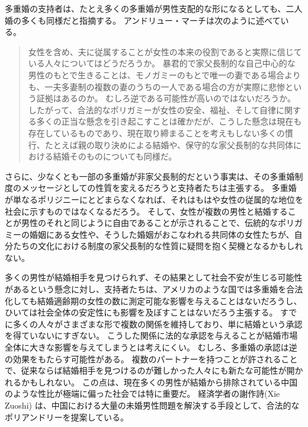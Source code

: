 \documentclass[paper=a4,book,openany]{jlreq}
\begin{document}
多重婚の支持者は、たとえ多くの多重婚が男性支配的な形になるとしても、二人婚の多くも同様だと指摘する。
アンドリュー・マーチは次のように述べている。

\begin{quote}
女性を含め、夫に従属することが女性の本来の役割であると実際に信じている人々についてはどうだろうか。
暴君的で家父長制的な自己中心的な男性のもとで生きることは、モノガミーのもとで唯一の妻である場合よりも、一夫多妻制の複数の妻のうちの一人である場合の方が実際に悲惨という証拠はあるのか。
むしろ逆である可能性が高いのではないだろうか。
したがって、合法的なポリガミーが女性の安全、福祉、そして自律に関する多くの正当な懸念を引き起こすことは確かだが、こうした懸念は現在も存在しているものであり、現在取り締まることを考えもしない多くの慣行、たとえば親の取り決めによる結婚や、保守的な家父長制的な共同体における結婚そのものについても同様だ。
\citep[p.260]{march11:_is_there_right_polyg}
\end{quote}

さらに、少なくとも一部の多重婚が非家父長制的だという事実は、その多重婚制度のメッセージとしての性質を変えるだろうと支持者たちは主張する。
多重婚が単なるポリジニーにとどまらなくなれば、それはもはや女性の従属的な地位を社会に示すものではなくなるだろう。
そして、女性が複数の男性と結婚することが男性のそれと同じように自由であることが示されることで、伝統的なポリガミーの婚姻にある女性や、そうした婚姻がおこなわれる共同体の女性たちが、自分たちの文化における制度の家父長制的な性質に疑問を抱く契機となるかもしれない。

多くの男性が結婚相手を見つけられず、その結果として社会不安が生じる可能性があるという懸念に対し、支持者たちは、アメリカのような国では多重婚を合法化しても結婚適齢期の女性の数に測定可能な影響を与えることはないだろうし、ひいては社会全体の安定性にも影響を及ぼすことはないだろう主張する。
すでに多くの人々がさまざまな形で複数の関係を維持しており、単に結婚という承認を得ていないにすぎない。
こうした関係に法的な承認を与えることが結婚市場全体に大きな影響を与えてしまうとは考えにくい。
むしろ、多重婚の承認は逆の効果をもたらす可能性がある。
複数のパートナーを持つことが許されることで、従来ならば結婚相手を見つけるのが難しかった人々にも新たな可能性が開かれるかもしれない。
この点は、現在多くの男性が結婚から排除されている中国のような性比が極端に偏った社会では特に重要だ。
経済学者の謝作詩(Xie Zuoshi) は、中国における大量の未婚男性問題を解決する手段として、合法的なポリアンドリーを提案している\citep{weller15:_econom_has_contr_solut_china}。
\end{document}
